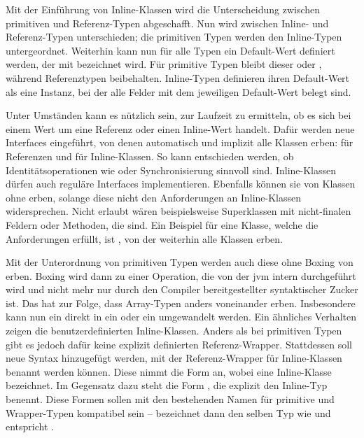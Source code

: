 Mit der Einführung von Inline-Klassen wird die Unterscheidung zwischen primitiven und Referenz-Typen abgeschafft.
Nun wird zwischen Inline- und Referenz-Typen unterschieden;
die primitiven Typen werden den Inline-Typen untergeordnet.
Weiterhin kann nun für alle Typen ein Default-Wert definiert werden, der mit  bezeichnet wird.
Für primitive Typen bleibt dieser  oder , während Referenztypen  beibehalten.
Inline-Typen definieren ihren Default-Wert als eine Instanz, bei der alle Felder mit dem jeweiligen Default-Wert belegt sind.

Unter Umständen kann es nützlich sein, zur Laufzeit zu ermitteln, ob es sich bei einem Wert um eine Referenz oder einen Inline-Wert handelt.
Dafür werden neue Interfaces eingeführt, von denen automatisch und implizit alle Klassen erben:
 für Referenzen und  für Inline-Klassen.
So kann entschieden werden, ob Identitätsoperationen wie \code{==} oder Synchronisierung sinnvoll sind.
Inline-Klassen dürfen auch reguläre Interfaces implementieren.
Ebenfalls können sie von Klassen ohne  erben, solange diese nicht den Anforderungen an Inline-Klassen widersprechen.
Nicht erlaubt wären beispielsweise Superklassen mit nicht-finalen Feldern oder Methoden, die  sind.
Ein Beispiel für eine Klasse, welche die Anforderungen erfüllt, ist , von der weiterhin alle Klassen erben.

Mit der Unterordnung von primitiven Typen werden auch diese ohne Boxing von  erben.
Boxing wird dann zu einer Operation, die von der \ac{jvm} intern durchgeführt wird und nicht mehr nur durch den Compiler bereitgestellter syntaktischer Zucker ist.
Das hat zur Folge, dass Array-Typen anders voneinander erben.
Insbesondere kann nun ein  direkt in ein  oder ein  umgewandelt werden.
Ein ähnliches Verhalten zeigen die benutzerdefinierten Inline-Klassen.
Anders als bei primitiven Typen gibt es jedoch dafür keine explizit definierten Referenz-Wrapper.
Stattdessen soll neue Syntax hinzugefügt werden, mit der Referenz-Wrapper für Inline-Klassen benannt werden können.
Diese nimmt die Form  an, wobei  eine Inline-Klasse bezeichnet.
Im Gegensatz dazu steht die Form , die explizit den Inline-Typ benennt.
Diese Formen sollen mit den bestehenden Namen für primitive und Wrapper-Typen kompatibel sein --  bezeichnet dann den selben Typ wie  und  entspricht .

